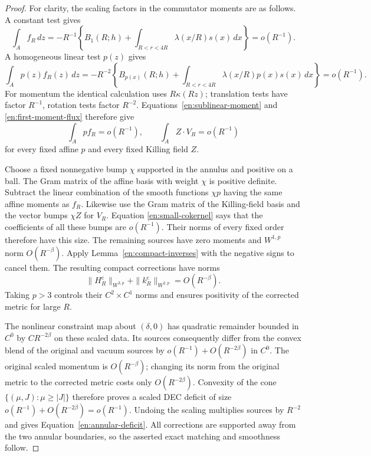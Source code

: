 \begin{proof}
For clarity, the scaling factors in the commutator moments are as
follows. A constant test gives
\[
 \int_A f_R\,dz
 =-R^{-1}\left\{B_1(R;h)
       +\int_{R<r<4R}\lambda(x/R)s(x)\,dx\right\}=o(R^{-1}).
\]
A homogeneous linear test $p(z)$ gives
\[
 \int_Ap(z)f_R(z)\,dz
 =-R^{-2}\left\{B_{p(x)}(R;h)
       +\int_{R<r<4R}\lambda(x/R)p(x)s(x)\,dx\right\}
 =o(R^{-1}).
\]
For momentum the identical calculation uses $R\kappa(Rz)$;
translation tests have factor $R^{-1}$, rotation tests factor
$R^{-2}$. Equations~\ref{en:sublinear-moment} and
\ref{en:first-moment-flux} therefore give
\begin{equation}\label{en:small-cokernel}
 \int_Ap f_R=o(R^{-1}),\qquad
 \int_A Z\cdot V_R=o(R^{-1})
\end{equation}
for every fixed affine $p$ and every fixed Killing field $Z$.

Choose a fixed nonnegative bump $\chi$ supported in the annulus
and positive on a ball. The Gram matrix of the affine basis with
weight $\chi$ is positive definite. Subtract the linear combination
of the smooth functions $\chi p$ having the same affine moments
as $f_R$. Likewise use the Gram matrix of the Killing-field basis
and the vector bumps $\chi Z$ for $V_R$. Equation
\ref{en:small-cokernel} says that the coefficients of all these
bumps are $o(R^{-1})$. Their norms of every fixed order therefore
have this size. The remaining sources have zero moments and
$W^{1,p}$ norm $O(R^{-\beta})$. Apply
Lemma~\ref{en:compact-inverses} with the negative signs to cancel
them. The resulting compact corrections have norms
\[
 \|H_R^{\mathrm c}\|_{W^{3,p}}
       +\|k_R^{\mathrm c}\|_{W^{2,p}}=O(R^{-\beta}).
\]
Taking $p>3$ controls their $C^2\times C^1$ norms and ensures
positivity of the corrected metric for large $R$.

The nonlinear constraint map about $(\delta,0)$ has quadratic
remainder bounded in $C^0$ by $C R^{-2\beta}$ on these scaled
data. Its sources consequently differ from the convex blend of
the original and vacuum sources by
$o(R^{-1})+O(R^{-2\beta})$ in $C^0$. The original scaled
momentum is $O(R^{-\beta})$; changing its norm from the original
metric to the corrected metric costs only $O(R^{-2\beta})$.
Convexity of the cone $\{(\mu,J):\mu\geq|J|\}$ therefore
proves a scaled DEC deficit of size
$o(R^{-1})+O(R^{-2\beta})=o(R^{-1})$.
Undoing the scaling multiplies sources by $R^{-2}$ and gives
Equation~\ref{en:annular-deficit}. All corrections are supported
away from the two annular boundaries, so the asserted exact
matching and smoothness follow.
\end{proof}

